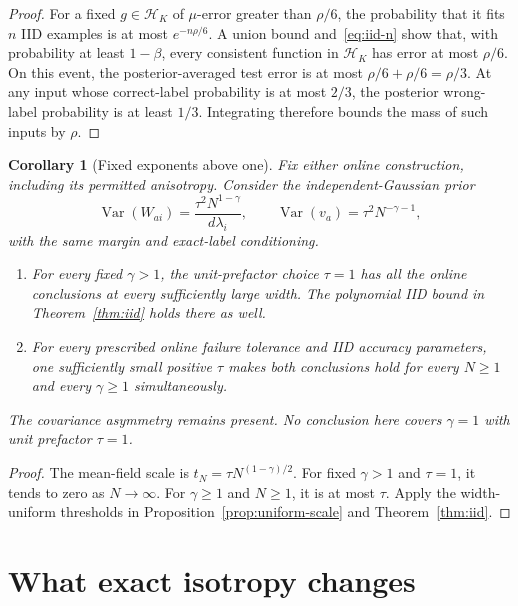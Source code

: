 \documentclass[11pt]{article}
\newtheorem{corollary}[theorem]{Corollary}
\begin{document}
\begin{proof}
For a fixed $g\in\mathcal H_K$ of $\mu$-error greater than $\rho/6$,
the probability that it fits $n$ IID examples is at most
$e^{-n\rho/6}$. A union bound and~\eqref{eq:iid-n} show that, with
probability at least $1-\beta$, every consistent function in
$\mathcal H_K$ has error at most $\rho/6$. On this event, the
posterior-averaged test error is at most $\rho/6+\rho/6=\rho/3$.
At any input whose correct-label probability is at most $2/3$, the
posterior wrong-label probability is at least $1/3$. Integrating
therefore bounds the mass of such inputs by $\rho$.
\end{proof}

\begin{corollary}[Fixed exponents above one]\label{cor:gamma}
Fix either online construction, including its permitted anisotropy.
Consider the independent-Gaussian prior
\begin{equation}\label{eq:gamma-prior}
 \operatorname{Var}(W_{ai})=\frac{\tau^2N^{1-\gamma}}{d\lambda_i},
 \qquad
 \operatorname{Var}(v_a)=\tau^2N^{-\gamma-1},
\end{equation}
with the same margin and exact-label conditioning.
\begin{enumerate}
\item For every fixed $\gamma>1$, the unit-prefactor choice $\tau=1$
has all the online conclusions at every sufficiently large width.
The polynomial IID bound in Theorem~\ref{thm:iid} holds there as well.
\item For every prescribed online failure tolerance and IID accuracy
parameters, one sufficiently small positive $\tau$ makes both
conclusions hold for every $N\ge1$ and every $\gamma\ge1$
simultaneously.
\end{enumerate}
The covariance asymmetry remains present. No conclusion here covers
$\gamma=1$ with unit prefactor $\tau=1$.
\end{corollary}
\begin{proof}
The mean-field scale is $t_N=\tau N^{(1-\gamma)/2}$.
For fixed $\gamma>1$ and $\tau=1$, it tends to zero as $N\to\infty$.
For $\gamma\ge1$ and $N\ge1$, it is at most $\tau$.
Apply the width-uniform thresholds in
Proposition~\ref{prop:uniform-scale} and Theorem~\ref{thm:iid}.
\end{proof}

\section{What exact isotropy changes}
\end{document}

